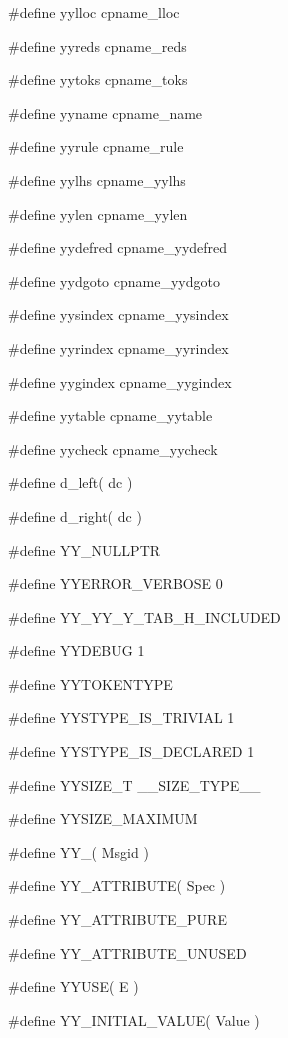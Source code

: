 \medskip
{\stt \#define yylloc cpname\_lloc}

\medskip
{\stt \#define yyreds cpname\_reds}

\medskip
{\stt \#define yytoks cpname\_toks}

\medskip
{\stt \#define yyname cpname\_name}

\medskip
{\stt \#define yyrule cpname\_rule}

\medskip
{\stt \#define yylhs cpname\_yylhs}

\medskip
{\stt \#define yylen cpname\_yylen}

\medskip
{\stt \#define yydefred cpname\_yydefred}

\medskip
{\stt \#define yydgoto cpname\_yydgoto}

\medskip
{\stt \#define yysindex cpname\_yysindex}

\medskip
{\stt \#define yyrindex cpname\_yyrindex}

\medskip
{\stt \#define yygindex cpname\_yygindex}

\medskip
{\stt \#define yytable cpname\_yytable}

\medskip
{\stt \#define yycheck cpname\_yycheck}

\medskip
{\stt \#define d\_left( dc )}

\medskip
{\stt \#define d\_right( dc )}

\medskip
{\stt \#define YY\_NULLPTR}

\medskip
{\stt \#define YYERROR\_VERBOSE 0}

\medskip
{\stt \#define YY\_YY\_Y\_TAB\_H\_INCLUDED}

\medskip
{\stt \#define YYDEBUG 1}

\medskip
{\stt \#define YYTOKENTYPE}

\medskip
{\stt \#define YYSTYPE\_IS\_TRIVIAL 1}

\medskip
{\stt \#define YYSTYPE\_IS\_DECLARED 1}

\medskip
{\stt \#define YYSIZE\_T \_\_SIZE\_TYPE\_\_}

\medskip
{\stt \#define YYSIZE\_MAXIMUM}

\medskip
{\stt \#define YY\_( Msgid )}

\medskip
{\stt \#define YY\_ATTRIBUTE( Spec )}

\medskip
{\stt \#define YY\_ATTRIBUTE\_PURE}

\medskip
{\stt \#define YY\_ATTRIBUTE\_UNUSED}

\medskip
{\stt \#define YYUSE( E )}

\medskip
{\stt \#define YY\_INITIAL\_VALUE( Value )}


